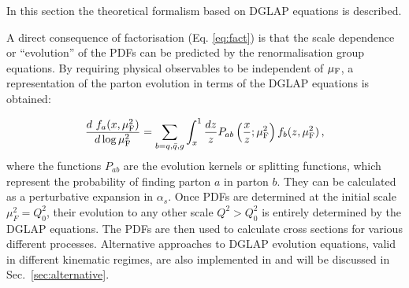 

%
In this section the theoretical formalism based on DGLAP \cite{Gribov:1972ri,Gribov:1972rt,Lipatov:1974qm,Dokshitzer:1977sg,Altarelli:1977zs} equations
is described. 

A direct consequence of factorisation (Eq. \ref{eq:fact}) is that the scale dependence or ``evolution'' of the PDFs can be predicted 
by the renormalisation group equations. 
By requiring physical observables to be independent of 
$\mu_\mathrm{F}$, a representation 
of the parton evolution in terms of the DGLAP equations is obtained:

\begin{eqnarray}
\frac{d~f_a(x,\mu_\mathrm{F}^2)}{d \log\mu_\mathrm{F}^2} = \sum_{b=q,\bar{q},g}\int_{x}^{1}\frac{d z}{z} 
P_{ab}\left(\frac{x}{z};\mu_\mathrm{F}^2\right) f_b(z,\mu_\mathrm{F}^2)\,,
\label{eq:dglap}
\end{eqnarray}
%
where the functions $P_{ab}$ are the evolution kernels or splitting functions, which represent the probability 
of finding parton $a$ in parton $b$. They can be calculated as a  perturbative expansion in $\alpha_s$. 
Once PDFs are determined at the initial
scale $\mu_F^2 = Q_0^2$, their evolution to any other scale $Q^2 > Q_0^2$ is entirely determined by the DGLAP equations.
The PDFs are then used to calculate cross sections for various different processes.
Alternative approaches to DGLAP evolution equations, valid in different kinematic regimes, 
are also implemented in \fitter and will be discussed in Sec.~\ref{sec:alternative}.



